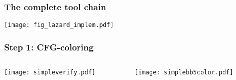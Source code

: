 \begin{frame} \frametitle{The complete tool chain}
\vfill
\texttt{[image: fig\_lazard\_implem.pdf]} 
\vfill
\end{frame}

\begin{frame} \frametitle{Step 1: CFG-coloring}
\vfill
\begin{columns}[t]
\begin{column}{0.40\textwidth}
\texttt{[image: simpleverify.pdf]} 
\end{column}
\begin{column}{0.40\textwidth}
\texttt{[image: simplebb5color.pdf]} 
\end{column}
\end{columns}
\vfill
\end{frame}




